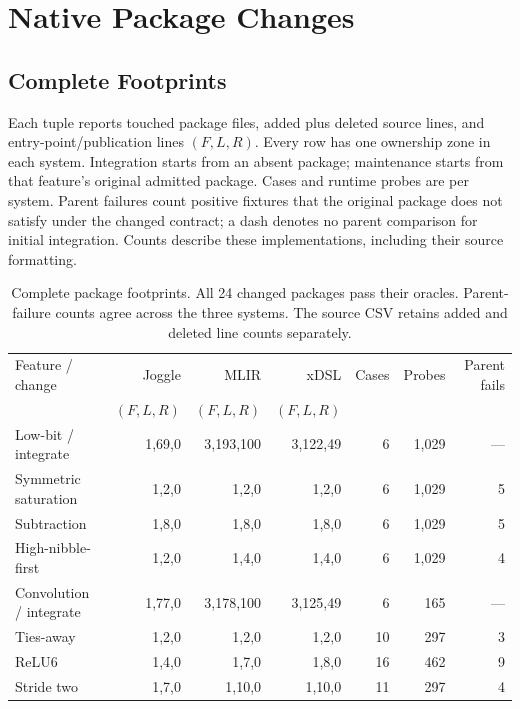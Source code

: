\section{Native Package Changes}
\label{sec:package-data}

\subsection{Complete Footprints}
Each tuple reports touched package files, added plus deleted source lines, and
entry-point/publication lines $(F,L,R)$. Every row has one ownership zone in
each system. Integration starts from an absent package; maintenance starts
from that feature's original admitted package. Cases and runtime probes are
per system. Parent failures count positive fixtures that the original package
does not satisfy under the changed contract; a dash denotes no parent
comparison for initial integration. Counts describe these implementations,
including their source formatting.

\begin{table}[!htbp]
  \centering\normalsize
  \caption{Complete package footprints. All 24 changed packages pass their
  oracles. Parent-failure counts agree across the three systems. The source CSV
  retains added and deleted line counts separately.}
  \label{tab:package-footprints}
  \setlength{\tabcolsep}{4pt}
  \renewcommand{\arraystretch}{1.15}
  \begin{tabular*}{\textwidth}{@{\extracolsep{\fill}}lrrrrrr@{}}
    \toprule
    Feature / change & Joggle & MLIR & xDSL & Cases & Probes & Parent fails \\
    & $(F,L,R)$ & $(F,L,R)$ & $(F,L,R)$ & & & \\
    \midrule
    Low-bit / integrate & 1,69,0 & 3,193,100 & 3,122,49 & 6 & 1,029 & --- \\
    Symmetric saturation & 1,2,0 & 1,2,0 & 1,2,0 & 6 & 1,029 & 5 \\
    Subtraction & 1,8,0 & 1,8,0 & 1,8,0 & 6 & 1,029 & 5 \\
    High-nibble-first & 1,2,0 & 1,4,0 & 1,4,0 & 6 & 1,029 & 4 \\
    \midrule
    Convolution / integrate & 1,77,0 & 3,178,100 & 3,125,49 & 6 & 165 & --- \\
    Ties-away & 1,2,0 & 1,2,0 & 1,2,0 & 10 & 297 & 3 \\
    ReLU6 & 1,4,0 & 1,7,0 & 1,8,0 & 16 & 462 & 9 \\
    Stride two & 1,7,0 & 1,10,0 & 1,10,0 & 11 & 297 & 4 \\
    \bottomrule
  \end{tabular*}
\end{table}

